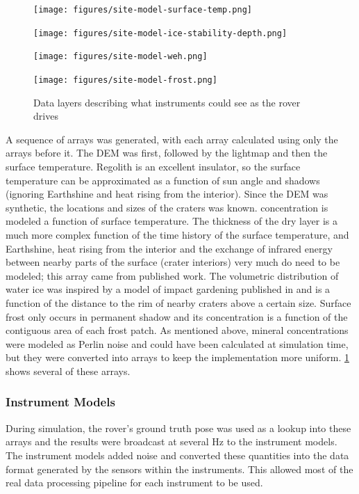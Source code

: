 \documentclass[twocolumn,letterpaper]{IEEEAerospaceCLS}  %
\begin{document}
\begin{figure}[htp]
\begin{subfloat}{
\texttt{[image: figures/site-model-surface-temp.png]}
}
\end{subfloat}
\qquad
\begin{subfloat}{
\texttt{[image: figures/site-model-ice-stability-depth.png]}
}
\end{subfloat}
\qquad
\begin{subfloat}{
\texttt{[image: figures/site-model-weh.png]}
}
\end{subfloat}
\qquad
\begin{subfloat}{
\texttt{[image: figures/site-model-frost.png]}
}
\end{subfloat}
\caption{Data layers describing what instruments could see as the rover drives
\label{fig:data-layers}}
\end{figure}

A sequence of arrays was generated, with each array calculated using only the arrays before it.  
The DEM was first, followed by the lightmap and then the surface temperature.  
Regolith is an excellent insulator, so the surface temperature can be approximated as a function of sun angle and shadows (ignoring Earthshine and heat rising from the interior).  
Since the DEM was synthetic, the locations and sizes of the craters was known.  
 concentration is modeled a function of surface temperature.  
The thickness of the dry layer is a much more complex function of the time history of the surface temperature, and Earthshine, heat rising from the interior and the exchange of infrared energy between nearby parts of the surface (crater interiors) very much do need to be modeled; this array came from published work\cite{siegler2015}.  
The volumetric distribution of water ice was inspired by a model of impact gardening published in \cite{hurley2012} and is a function of the distance to the rim of nearby craters above a certain size.  
Surface frost only occurs in permanent shadow and its concentration is a function of the contiguous area of each frost patch.  
As mentioned above, mineral concentrations were modeled as Perlin noise and could have been calculated at simulation time, but they were converted into arrays to keep the implementation more uniform.  
\cref{fig:data-layers} shows several of these arrays.

\subsubsection{Instrument Models}
During simulation, the rover's ground truth pose was used as a lookup into these arrays and the results were broadcast at several Hz to the instrument models.  
The instrument models added noise and converted these quantities into the data format generated by the sensors within the instruments.  
This allowed most of the real data processing pipeline for each instrument to be used.
\end{document}
